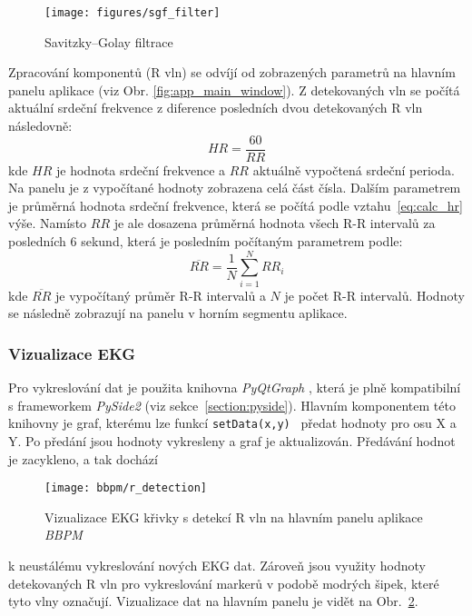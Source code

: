 \begin{figure}[h]
    \begin{center}
        \texttt{[image: figures/sgf\_filter]}
        \caption{Savitzky–Golay filtrace}
        \label{fig:sgf_filter}
    \end{center}
\end{figure}

Zpracování komponentů (R vln) se odvíjí od zobrazených parametrů na hlavním
panelu aplikace (viz Obr. \ref{fig:app_main_window}). Z detekovaných vln se
počítá aktuální srdeční frekvence z diference posledních dvou detekovaných R vln
následovně:
\begin{equation}
    \label{eq:calc_hr}
    HR = \frac{60}{RR}
\end{equation}
kde $HR$ je hodnota srdeční frekvence a $RR$ aktuálně vypočtená srdeční
perioda. Na panelu je z vypočítané hodnoty zobrazena celá část čísla. Dalším
parametrem je průměrná hodnota srdeční frekvence, která se počítá podle
vztahu~\ref{eq:calc_hr} výše. Namísto $RR$ je ale dosazena průměrná hodnota
všech R-R intervalů za posledních 6 sekund, která je posledním počítaným
parametrem podle:
\begin{equation}
    \overline{RR} = \frac{1}{N} \sum_{i=1}^N RR_i
\end{equation}
kde $\overline{RR}$ je vypočítaný průměr R-R intervalů a $N$ je počet R-R
intervalů. Hodnoty se následně zobrazují na panelu v horním segmentu aplikace.

\subsubsection{Vizualizace EKG}
\label{section:visual}
Pro vykreslování dat je použita knihovna \textit{PyQtGraph} \cite{PyQtGraph},
která je plně kompatibilní s frameworkem \textit{PySide2} (viz
sekce~\ref{section:pyside}). Hlavním komponentem této knihovny je graf, kterému
lze funkcí \texttt{setData(x,y)}~\cite{curveItem} předat hodnoty pro osu X a Y.
Po předání jsou hodnoty vykresleny a graf je aktualizován. Předávání hodnot je
zacykleno, a tak dochází
\begin{figure}[H]
    \begin{center}
        \texttt{[image: bbpm/r\_detection]}
        \caption{Vizualizace EKG křivky s detekcí R vln na hlavním panelu
        aplikace \textit{BBPM}}
        \label{fig:app_ecg_visual}
    \end{center}
\end{figure}
\noindent k neustálému vykreslování nových EKG dat. Zároveň jsou využity hodnoty
detekovaných R vln pro vykreslování markerů v podobě modrých šipek, které tyto
vlny označují. Vizualizace dat na hlavním panelu je vidět na
Obr.~\ref{fig:app_ecg_visual}.

